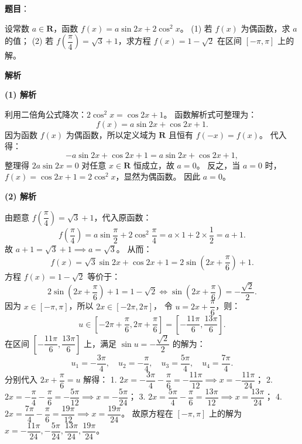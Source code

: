 \begin{answer}

\textbf{题目}：

设常数 $a \in \mathbf{R}$，函数 $f(x) = a\sin 2x + 2\cos^2 x$。
(1) 若 $f(x)$ 为偶函数，求 $a$ 的值；
(2) 若 $f\left(\dfrac{\pi}{4}\right) = \sqrt{3} + 1$，求方程 $f(x) = 1 - \sqrt{2}$ 在区间 $[-\pi, \pi]$ 上的解。

\textbf{解析}

\textbf{(1) 解析}

利用二倍角公式降次：$2\cos^2 x = \cos 2x + 1$。
函数解析式可整理为：
\nopagebreak[4]
\[f(x) = a\sin 2x + \cos 2x + 1.\]
因为函数 $f(x)$ 为偶函数，所以定义域为 $\mathbf{R}$ 且恒有 $f(-x) = f(x)$。
代入得：
\nopagebreak[4]
\[-a\sin 2x + \cos 2x + 1 = a\sin 2x + \cos 2x + 1,\]
整理得 $2a\sin 2x = 0$ 对任意 $x \in \mathbf{R}$ 恒成立，故 $a = 0$。
反之，当 $a = 0$ 时，$f(x) = \cos 2x + 1 = 2\cos^2 x$，显然为偶函数。
因此 $a = 0$。

\textbf{(2) 解析}

由题意 $f\left(\dfrac{\pi}{4}\right) = \sqrt{3} + 1$，代入原函数：
\nopagebreak[4]
\[f\left(\frac{\pi}{4}\right) = a\sin\frac{\pi}{2} + 2\cos^2\frac{\pi}{4} = a \times 1 + 2 \times \frac{1}{2} = a + 1.\]
故 $a + 1 = \sqrt{3} + 1 \implies a = \sqrt{3}$。
从而：
\nopagebreak[4]
\[f(x) = \sqrt{3}\sin 2x + \cos 2x + 1 = 2\sin\left(2x + \frac{\pi}{6}\right) + 1.\]
方程 $f(x) = 1 - \sqrt{2}$ 等价于：
\nopagebreak[4]
\[2\sin\left(2x + \frac{\pi}{6}\right) + 1 = 1 - \sqrt{2} \iff \sin\left(2x + \frac{\pi}{6}\right) = -\frac{\sqrt{2}}{2}.\]
因为 $x \in [-\pi, \pi]$，所以 $2x \in [-2\pi, 2\pi]$，
令 $u = 2x + \dfrac{\pi}{6}$，则：
\nopagebreak[4]
\[u \in \left[-2\pi + \frac{\pi}{6}, 2\pi + \frac{\pi}{6}\right] = \left[-\frac{11\pi}{6}, \frac{13\pi}{6}\right].\]
在区间 $\left[-\dfrac{11\pi}{6}, \dfrac{13\pi}{6}\right]$ 上，满足 $\sin u = -\dfrac{\sqrt{2}}{2}$ 的解为：
\nopagebreak[4]
\[u_1 = -\frac{3\pi}{4}, \quad u_2 = -\frac{\pi}{4}, \quad u_3 = \frac{5\pi}{4}, \quad u_4 = \frac{7\pi}{4}.\]
分别代入 $2x + \dfrac{\pi}{6} = u$ 解得：
1. $2x = -\dfrac{3\pi}{4} - \dfrac{\pi}{6} = -\dfrac{11\pi}{12} \implies x = -\dfrac{11\pi}{24}$；
2. $2x = -\dfrac{\pi}{4} - \dfrac{\pi}{6} = -\dfrac{5\pi}{12} \implies x = -\dfrac{5\pi}{24}$；
3. $2x = \dfrac{5\pi}{4} - \dfrac{\pi}{6} = \dfrac{13\pi}{12} \implies x = \dfrac{13\pi}{24}$；
4. $2x = \dfrac{7\pi}{4} - \dfrac{\pi}{6} = \dfrac{19\pi}{12} \implies x = \dfrac{19\pi}{24}$。
故原方程在 $[-\pi, \pi]$ 上的解为 $x = -\dfrac{11\pi}{24}, -\dfrac{5\pi}{24}, \dfrac{13\pi}{24}, \dfrac{19\pi}{24}$。



\end{answer}
